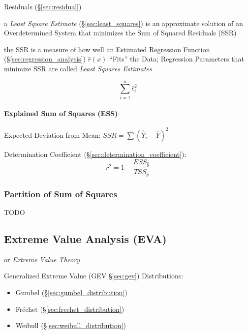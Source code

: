 Residuals (\S\ref{sec:residual})

\fist a \emph{Least Square Estimate} (\S\ref{sec:least_squares}) is an
approximate solution of an Overdetermined System that minimizes the Sum of
Squared Residuals (SSR)

the SSR is a measure of how well an Estimated Regression Function
(\S\ref{sec:regression_analysis}) $\hat{r}(x)$ ``Fits'' the Data; Regression
Parameters that minimize SSR are called \emph{Least Squares Estimates}

\[
  \sum_{i=1}^n \hat{\epsilon}_i^2
\]



\paragraph{Explained Sum of Squares (ESS)}\label{sec:ess}\hfill

Expected Deviation from Mean: $SSR = \sum(\hat{Y}_i - \overline{Y})^2$

Determination Coefficient (\S\ref{sec:determination_coefficient}):
\[
  r^2 = 1 - \frac{
    ESS_{\hat{y}}
  }{
    TSS_{\overline{y}}
  }
\]



\subsubsection{Partition of Sum of Squares}\label{sec:partition_squares}

TODO



\subsection{Extreme Value Analysis (EVA)}\label{sec:eva}

or \emph{Extreme Value Theory}

Generalized Extreme Value (GEV \S\ref{sec:gev}) Distributions:

\begin{itemize}
  \item Gumbel (\S\ref{sec:gumbel_distribution})
  \item Fr\'echet (\S\ref{sec:frechet_distribution})
  \item Weibull (\S\ref{sec:weibull_distribution})
\end{itemize}

